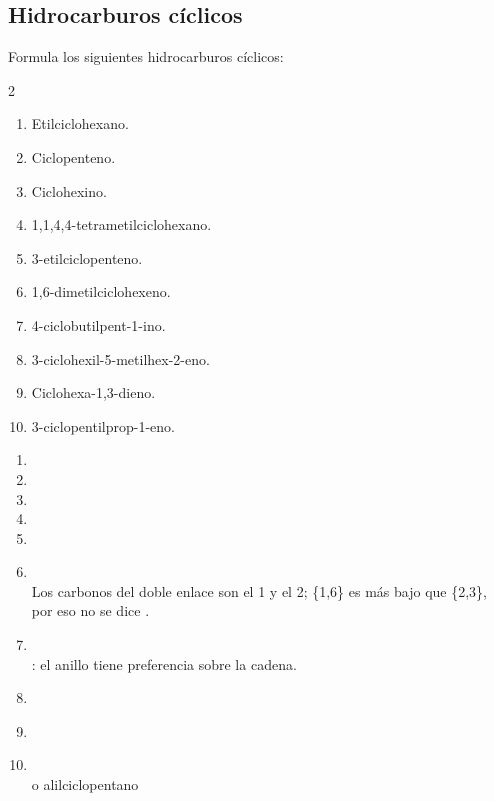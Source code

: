 \subsection*{Hidrocarburos cíclicos}

\begin{exercise}
    Formula los siguientes hidrocarburos cíclicos:
    \begin{multicols}{2}
        \begin{enumerate}[label=\alph*)]
            \item Etilciclohexano.
            \item Ciclopenteno.
            \item Ciclohexino.
            \item 1,1,4,4-tetrametilciclohexano.
            \item 3-etilciclopenteno.
            \item 1,6-dimetilciclohexeno.
            \item 4-ciclobutilpent-1-ino.
            \item 3-ciclohexil-5-metilhex-2-eno.
            \item Ciclohexa-1,3-dieno.
            \item 3-ciclopentilprop-1-eno.
        \end{enumerate}
    \end{multicols}
    \begin{solu}
        \begin{enumerate}[label=\alph*)]
            \item {}
            \item {}
            \item {}
            \item {}
            \item {}
            \item {}\\
                  Los carbonos del doble enlace son el 1 y el 2; \{1,6\} es más bajo que \{2,3\}, por eso no se dice .
            \item {}\\
                  : el anillo tiene preferencia sobre la cadena.
            \item {}\\
            \item {}
            \item {}\\
                   o alilciclopentano
        \end{enumerate}
    \end{solu}
\end{exercise}

